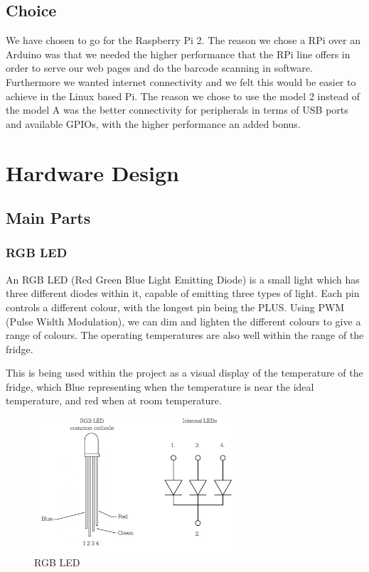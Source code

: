 \documentclass[10pt]{article}
\begin{document}
\subsection{Choice}
We have chosen to go for the Raspberry Pi 2. The reason we chose a RPi over an Arduino was that we needed the higher performance that the RPi line offers in order to serve our web pages and do the barcode scanning in software. Furthermore we wanted internet connectivity and we felt this would be easier to achieve in the Linux based Pi. The reason we chose to use the model 2 instead of the model A was the better connectivity for peripherals in terms of USB ports and available GPIOs, with the higher performance an added bonus.

\newpage
\section{Hardware Design}
\subsection{Main Parts}
\subsubsection{RGB LED}

An RGB LED (Red Green Blue Light Emitting Diode) is a small light which has three different diodes within it, capable of emitting three types of light. Each pin controls a different colour, with the longest pin being the PLUS. Using PWM (Pulse Width Modulation), we can dim and lighten the different colours to give a range of colours. The operating temperatures are also well within the range of the fridge.

This is being used within the project as a visual display of the temperature of the fridge, which Blue representing when the temperature is near the ideal temperature, and red when at room temperature.

\begin{figure}[h]
\centering
\caption{RGB LED}
\label{RGB LED}
\includegraphics[height=5cm]{images/rgb_led_diagram.jpg}
\end{figure}
\end{document}

